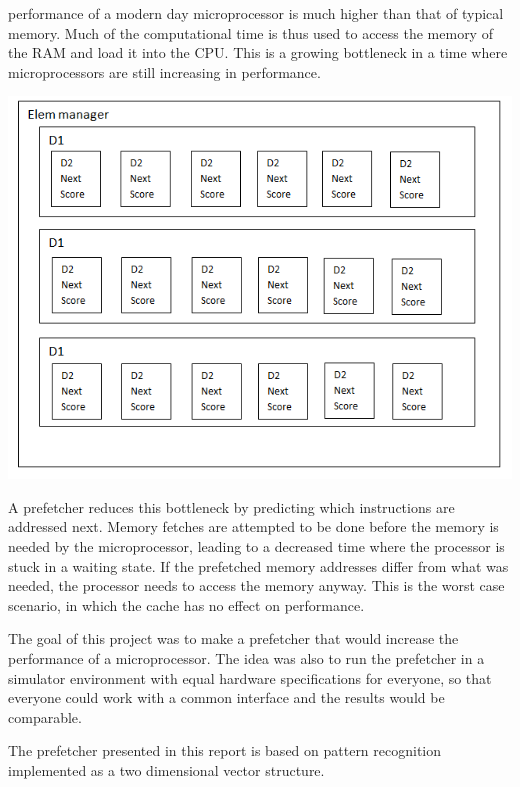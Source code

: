  performance of a modern day microprocessor is much higher than that of typical memory. Much of the computational time is thus used to access the memory of the RAM and load it into the CPU. This is a growing bottleneck in a time where microprocessors are still increasing in performance. 

\includegraphics{table3.png}

A prefetcher reduces this bottleneck by predicting which instructions are addressed next. Memory fetches are attempted to be done before the memory is needed by the microprocessor, leading to a decreased time where the processor is stuck in a waiting state. If the prefetched memory addresses differ from what was needed, the processor needs to access the memory anyway. This is the worst case scenario, in which the cache has no effect on performance.

The goal of this project was to make a prefetcher that would increase the performance of a microprocessor. The idea was also to run the prefetcher in a simulator environment with equal hardware specifications for everyone, so that everyone could work with a common interface and the results would be comparable. 

The prefetcher presented in this report is based on pattern recognition implemented as a two dimensional vector structure.
